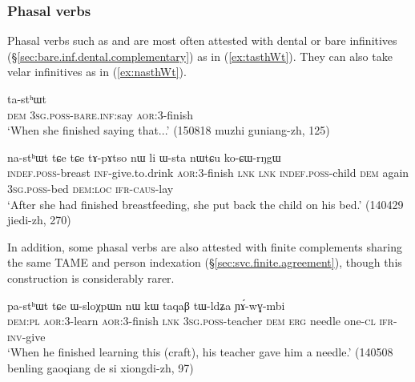 \subsubsection{Phasal verbs} \label{sec:phasal.complements}

Phasal verbs such as   and   are most often attested with dental or bare infinitives (§\ref{sec:bare.inf.dental.complementary}) as in (\ref{ex:tasthWt}).  They can also take  velar infinitives as in (\ref{ex:nasthWt}).

\begin{exe}
\ex \label{ex:tasthWt}
\gll [nɯ ɯ-ti] ta-stʰɯt  \\
\textsc{dem} \textsc{3sg}.\textsc{poss}-\textsc{bare}.\textsc{inf}:say \textsc{aor}:3\flobv{}-finish \\
\glt `When she finished saying that...' (150818 muzhi guniang-zh, 125)
\end{exe}
 

\begin{exe}
\ex \label{ex:nasthWt}
\gll [tɯ-nɯ kɤ-jtsʰi] na-stʰɯt tɕe tɕe tɤ-pɤtso nɯ li ɯ-sta nɯtɕu ko-ɕɯ-rŋgɯ	\\
\textsc{indef}.\textsc{poss}-breast \textsc{inf}-give.to.drink \textsc{aor}:3\flobv{}-finish \textsc{lnk} \textsc{lnk} \textsc{indef}.\textsc{poss}-child \textsc{dem} again \textsc{3sg}.\textsc{poss}-bed \textsc{dem}:\textsc{loc} \textsc{ifr}-\textsc{caus}-lay \\
\glt `After she had finished breastfeeding, she put back the child on his bed.' (140429 jiedi-zh, 270)
\end{exe}

In addition, some phasal verbs are also attested with finite complements sharing the same TAME and person indexation (§\ref{sec:svc.finite.agreement}), though this construction is considerably rarer.

\begin{exe}
\ex \label{ex:pasthWt}
 pa-stʰɯt tɕe ɯ-sloχpɯn nɯ kɯ taqaβ tɯ-ldʑa ɲɤ́-wɣ-mbi \\
 \textsc{dem}:\textsc{pl} \textsc{aor}:3\flobv{}-learn \textsc{aor}:3\flobv{}-finish \textsc{lnk} \textsc{3sg}.\textsc{poss}-teacher \textsc{dem} \textsc{erg} needle one-\textsc{cl} \textsc{ifr}-\textsc{inv}-give  \\
\glt `When he finished learning this (craft), his teacher gave him a needle.' (140508 benling gaoqiang de si xiongdi-zh, 97)
\end{exe} 


